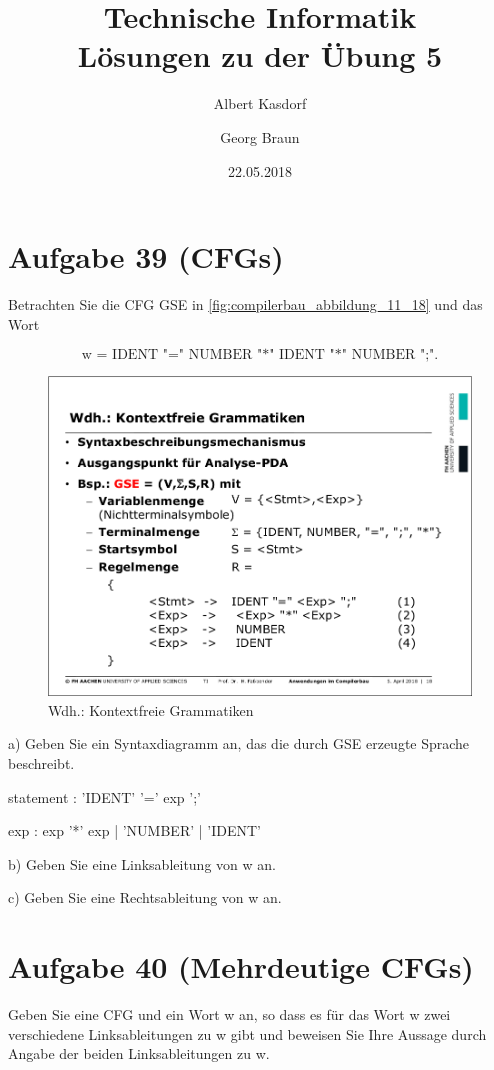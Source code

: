 \documentclass{article}
\title{Technische Informatik\\ Lösungen zu der Übung 5}
\author{
	Albert Kasdorf\and
	Georg Braun
}
\date{22.05.2018}
\begin{document}
\maketitle

\section*{Aufgabe 39 (CFGs)}
Betrachten Sie die CFG GSE in \autoref{fig:compilerbau_abbildung_11_18} und das Wort

\begin{equation*}
	\text{w = IDENT "=" NUMBER "*" IDENT "*" NUMBER ";".}
\end{equation*}


\begin{figure}[h]
	\centering
	\includegraphics[width=0.75\linewidth]{Compilerbau_Abbildung_11_18}
	\caption{Wdh.: Kontextfreie Grammatiken}
	\label{fig:compilerbau_abbildung_11_18}
\end{figure}

a) Geben Sie ein Syntaxdiagramm an, das die durch GSE erzeugte Sprache beschreibt.

\begin{rail}
	statement : 'IDENT' '=' exp ';'
\end{rail}


\begin{rail}
	exp : exp '*' exp | 'NUMBER' | 'IDENT'
\end{rail}


b) Geben Sie eine Linksableitung von w an.


c) Geben Sie eine Rechtsableitung von w an.


\section*{Aufgabe 40 (Mehrdeutige CFGs)}
Geben Sie eine CFG und ein Wort w an, so dass es für das Wort w zwei verschiedene Linksableitungen zu w gibt und beweisen Sie Ihre Aussage durch Angabe der beiden Linksableitungen zu w.
\end{document}
